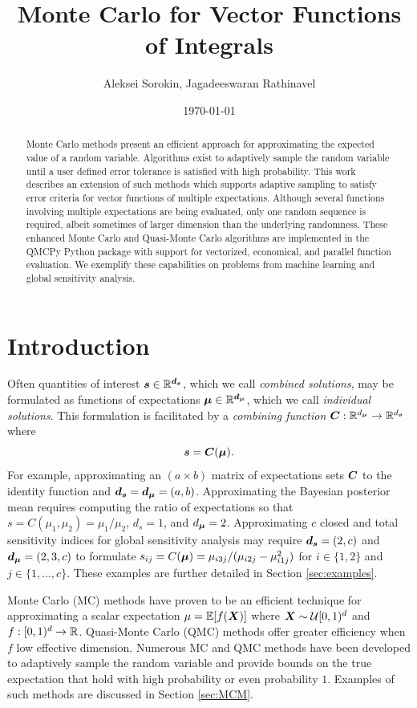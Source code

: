 \documentclass{article}[12pt]
\title{Monte Carlo for Vector Functions of Integrals}
\author{Aleksei Sorokin, Jagadeeswaran Rathinavel}
\date{\today}
\begin{document}
\maketitle

\begin{abstract}
Monte Carlo methods present an efficient approach for approximating the expected value of a random variable. Algorithms exist to adaptively sample the random variable until a user defined error tolerance is satisfied with high probability. This work describes an extension of such methods which supports adaptive sampling to satisfy error criteria for vector functions of multiple expectations. Although several functions involving multiple expectations are being evaluated, only one random sequence is required, albeit sometimes of larger dimension than the underlying randomness. These enhanced Monte Carlo and Quasi-Monte Carlo algorithms are implemented in the QMCPy Python package with support for vectorized, economical, and parallel function evaluation. We exemplify these capabilities on problems from machine learning and global sensitivity analysis.
\end{abstract}

\tableofcontents

\newpage

\section{Introduction}

Often quantities of interest $\boldsymbol{s} \in \mathbb{R}^{\boldsymbol{d}_{\boldsymbol{s}}}$, which we call \emph{combined solutions}, may be formulated as functions of expectations $\boldsymbol{\mu} \in \mathbb{R}^{\boldsymbol{d}_{\boldsymbol{\mu}}}$, which we call \emph{individual solutions}. This formulation is facilitated by a \emph{combining function} $\boldsymbol{C}: \mathbb{R}^{d_{\boldsymbol{\mu}}} \to \mathbb{R}^{d_{\boldsymbol{s}}}$ where 
$$\boldsymbol{s} = \boldsymbol{C}(\boldsymbol{\mu}).$$ 
For example, approximating an $(a \times b)$ matrix of expectations sets $\boldsymbol{C}$ to the identity function and $\boldsymbol{d}_{\boldsymbol{s}} = \boldsymbol{d}_{\boldsymbol{\mu}} = (a,b)$. Approximating the Bayesian posterior mean requires computing the ratio of expectations so that $s = C(\mu_1,\mu_2) = \mu_1/\mu_2$, $d_s = 1$, and $d_{\boldsymbol{\mu}} = 2$. Approximating $c$ closed and total sensitivity indices for global sensitivity analysis may require $\boldsymbol{d}_{\boldsymbol{s}} = (2,c)$ and $\boldsymbol{d}_{\boldsymbol{\mu}} = (2,3,c)$ to formulate $s_{ij} = C(\boldsymbol{\mu}) =  \mu_{i3j}/(\mu_{i2j}-\mu_{i1j}^2)$ for $i \in \{1,2\}$ and $j \in \{1,\dots,c\}$. These examples are further detailed in Section \ref{sec:examples}.

Monte Carlo (MC) methods have proven to be an efficient technique for approximating a scalar expectation $\mu = \mathbb{E}[f(\boldsymbol{X})]$ where $\boldsymbol{X} \sim \mathcal{U}[0,1)^d$ and $f: [0,1)^d \to \mathbb{R}$. Quasi-Monte Carlo (QMC) methods offer greater efficiency when $f$ low effective dimension. Numerous MC and QMC methods have been developed to adaptively sample the random variable and provide bounds on the true expectation that hold with high probability or even probability $1$. Examples of such methods are discussed in Section \ref{sec:MCM}. 
\end{document}

